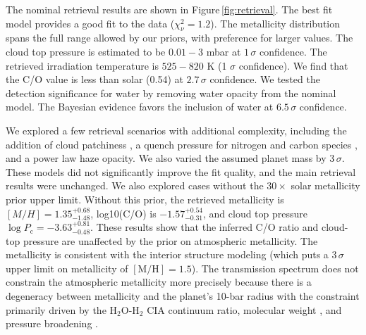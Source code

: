 \documentclass[twocolumn, trackchanges]{aastex61}
\begin{document}

The nominal retrieval results are shown in Figure\,\ref{fig:retrieval}.  The best fit model provides a good fit to the data ($\chi^2_\nu = 1.2$).  The metallicity distribution spans the full range allowed by our priors, with preference for larger values. The cloud top pressure is estimated to be $0.01 - 3$ mbar at $1\,\sigma$ confidence. The retrieved irradiation temperature is $525 - 820$ K (1 $\sigma$ confidence).  We find that the C/O value is less than solar (0.54) at $2.7\,\sigma$ confidence.  We tested the detection significance for water by removing water opacity from the nominal model. The Bayesian evidence favors the inclusion of water at $6.5\,\sigma$ confidence. 

We explored a few retrieval scenarios with additional complexity, including the addition of cloud patchiness \citep{line16}, a quench pressure for nitrogen and carbon species \citep[e.g.][]{morley17}, and a power law haze opacity.  We also varied the assumed planet mass by $3\,\sigma$. These models did not significantly improve the fit quality, and the main retrieval results were unchanged.  We also explored cases without the $30\times$ solar metallicity prior upper limit. Without this prior, the retrieved metallicity is $[M/H] = 1.35^{+0.68}_{-1.48}$, log10(C/O) is $-1.57^{+0.54}_{-0.31}$, and cloud top pressure $\log P_\mathrm{c} = -3.63^{+0.81}_{-0.48}.$ These results show that the inferred C/O ratio and cloud-top pressure are unaffected by the prior on atmospheric metallicity.  The metallicity is consistent with the interior structure modeling (which puts a $3\,\sigma$ upper limit on metallicity of $[\mathrm{M/H}] = 1.5$). The transmission spectrum does not constrain the atmospheric metallicity more precisely because there is a degeneracy between metallicity and the planet's 10-bar radius \citep[e.g]{griffith14,heng17} with the constraint primarily driven by the H$_2$O-H$_2$ CIA continuum ratio, molecular weight \citep{line16}, and pressure broadening \citep{dewit13}.

\end{document}
